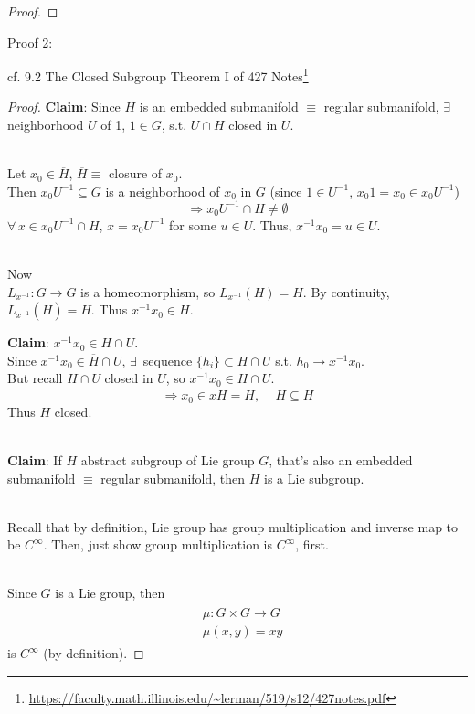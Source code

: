 \documentclass[10pt]{amsart}
\begin{document}
\begin{multicols*}{2}
\begin{proof}
	
	\end{proof}

Proof 2:

cf. 9.2 The Closed Subgroup Theorem I of 427 Notes\footnote{\url{https://faculty.math.illinois.edu/~lerman/519/s12/427notes.pdf}}

\begin{proof}

	\textbf{Claim}: Since $H$ is an embedded submanifold $\equiv $ regular submanifold, $\exists \, $ neighborhood $U$ of 1, $1 \in G$, s.t. $U\cap H$ closed in $U$. 
	
	\qquad \, \\
	Let $x_0 \in \overline{H}$, $\overline{H} \equiv $ closure of $x_0$. \\
	Then $x_0U^{-1} \subseteq G$ is a neighborhood of $x_0$ in $G$ (since $1 \in U^{-1}$, $x_0 1 = x_0 \in x_0 U^{-1}$)
	\[
	\Longrightarrow x_0 U^{-1} \cap H \neq \emptyset 
	\]
	$\forall \, x \in x_0 U^{-1} \cap H$, $x= x_0 U^{-1}$ for some $u\in U$. Thus, $x^{-1} x_0 = u \in U$.
	
	\quad \\
	Now  \\
	$L_{x^{-1}} : G \to G$ is a homeomorphism, so $L_{x^{-1}}(H) = H$. By continuity, $L_{x^{-1}}(\overline{H}) = \overline{H}$. Thus $x^{-1}x_0 \in \overline{H}$. 
	
	\textbf{Claim}: $x^{-1} x_0 \in H \cap U$. \\
	Since $x^{-1}x_0 \in \overline{H} \cap U$, $\exists \, $ sequence $\lbrace h_i \rbrace \subset H \cap U$ s.t. $h_0 \to x^{-1} x_0$. \\
	But recall $H\cap U$ closed in $U$, so $x^{-1}x_0 \in H\cap U$. 
	\[
	\Longrightarrow x_0 \in xH = H , \quad \, \overline{H} \subseteq H
	\]
	Thus $H$ closed. 

	\quad \\ 	
	\textbf{Claim}: If $H$ abstract subgroup of Lie group $G$, that's also an embedded submanifold $\equiv$ regular submanifold, then $H$ is a Lie subgroup. 
	
	\quad \\ 
	Recall that by definition, Lie group has group multiplication and inverse map to be $C^{\infty}$. Then, just show group multiplication is $C^{\infty}$, first.

\quad \\	
Since $G$ is a Lie group, then
\[
\begin{gathered}
\begin{aligned}
& \mu : G \times G \to G \\
& \mu(x,y) = xy
\end{aligned}
\end{gathered}
\]	
is $C^{\infty}$ (by definition).


\end{proof}
\end{multicols*}
\end{document}
